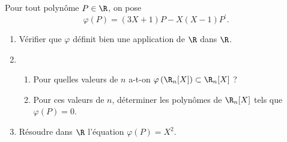 \documentclass[a4paper, 11pt,reqno]{article}
\begin{document}
\begin{exercice}  \;
	Pour tout polyn\^ome $P\in\R$, on pose
	$$\varphi(P)=(3X+1)P-X(X-1)P^{\prime}.$$
	\begin{enumerate}
		\item V\'erifier que $\varphi$ d\'efinit bien une application de $\R$ dans $\R$.
		\item
		      \begin{enumerate}
			      \item Pour quelles valeurs de $n$ a-t-on $\varphi\left( \R_n\lbrack X\rbrack\right)\subset \R_n\lbrack X\rbrack$ ?
			      \item  Pour ces valeurs de $n$, d\'eterminer les polyn\^omes de $\R_n\lbrack X\rbrack$ tels que $\varphi(P)=0$.
		      \end{enumerate}
		\item R\'esoudre dans $\R$ l'\'equation $\varphi(P)=X^2$.
	\end{enumerate}
\end{exercice}
\end{document}
